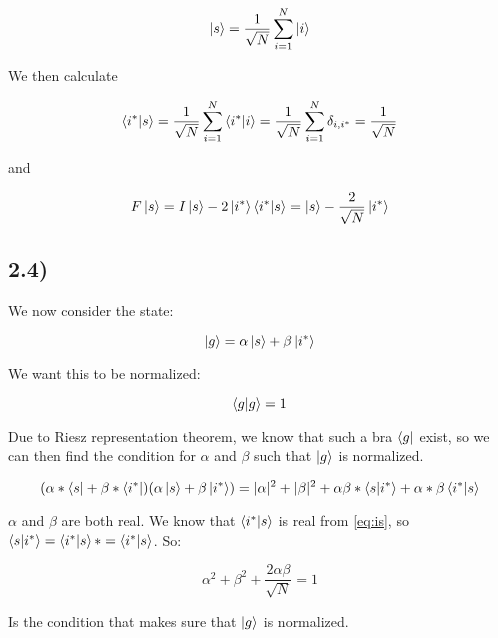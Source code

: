\documentclass[a4paper,norsk, 10pt]{article}
\begin{document}
\begin{equation}
\ket{s} = \frac{1}{\sqrt{N}} \sum_{i=1}^N \ket{i}
\end{equation}

We then calculate 

\begin{equation}
\braket{i^*}{s} = \frac{1}{\sqrt{N}} \sum_{i=1}^N \braket{i^*}{i} = \frac{1}{\sqrt{N}} \sum_{i=1}^N \delta_{i,i^*} = \frac{1}{\sqrt{N}} 
\end{equation}\label{eq:is}


and

\begin{equation}
F\ket{s} = I\ket{s} - 2\ket{i^*}\bra{i^*}\ket{s} = \ket{s} - \frac{2}{\sqrt{N}}\ket{i^*}
\end{equation}



\subsection{2.4)}

We now consider the state:

\begin{equation}
\ket{g} = \alpha \ket{s} + \beta\ket{i^*}
\end{equation}

We want this to be normalized:

\begin{equation}
\braket{g}{g} = 1
\end{equation}

Due to Riesz representation theorem, we know that such a bra $\bra{g}$ exist, so we can then find the condition for $\alpha$ and $\beta$ such that $\ket{g}$ is normalized.

\begin{equation}
(\alpha* \bra{s} + \beta*\bra{i^*})(\alpha \ket{s} + \beta\ket{i^*}) = |\alpha|^2 + |\beta|^2 + \alpha\beta* \braket{s}{i^*} + \alpha*\beta \braket{i^*}{s}
\end{equation}

$\alpha$ and $\beta$ are both real. We know that $\braket{i^*}{s}$ is real from \eqref{eq:is}, so $\braket{s}{i^*} = \braket{i^*}{s}* = \braket{i^*}{s}$. So: 

\begin{equation}
\alpha^2 + \beta^2 + \frac{2\alpha \beta}{\sqrt{N}} = 1
\end{equation}

Is the condition that makes sure that $\ket{g}$ is normalized.
\end{document}
